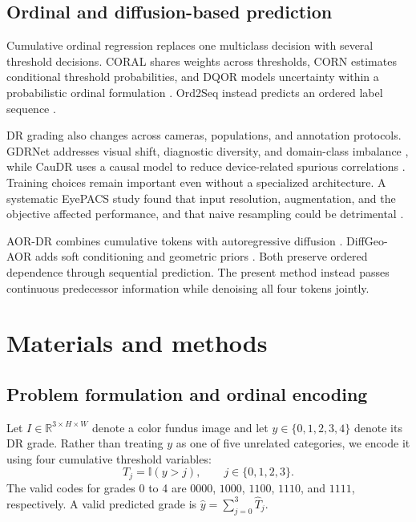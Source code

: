 \documentclass[a4paper,fleqn]{cas-sc}
\begin{document}
\subsection{Ordinal and diffusion-based prediction}

Cumulative ordinal regression replaces one multiclass decision with several threshold decisions. CORAL shares weights across thresholds, CORN estimates conditional threshold probabilities, and DQOR models uncertainty within a probabilistic ordinal formulation \citep{cao2020coral,shi2023corn,toledo2022dqor}. Ord2Seq instead predicts an ordered label sequence \citep{wang2023ord2seq}.

DR grading also changes across cameras, populations, and annotation protocols. GDRNet addresses visual shift, diagnostic diversity, and domain-class imbalance \citep{che2023gdrnet}, while CauDR uses a causal model to reduce device-related spurious correlations \citep{wei2024caudr}. Training choices remain important even without a specialized architecture. A systematic EyePACS study found that input resolution, augmentation, and the objective affected performance, and that naive resampling could be detrimental \citep{huang2023components}.

AOR-DR combines cumulative tokens with autoregressive diffusion \citep{yu2025aordr}. DiffGeo-AOR adds soft conditioning and geometric priors \citep{yu2026diffgeo}. Both preserve ordered dependence through sequential prediction. The present method instead passes continuous predecessor information while denoising all four tokens jointly.

\section{Materials and methods}
\label{sec:methods}

\subsection{Problem formulation and ordinal encoding}

Let $I\in\mathbb{R}^{3\times H\times W}$ denote a color fundus image and let $y\in\{0,1,2,3,4\}$ denote its DR grade. Rather than treating $y$ as one of five unrelated categories, we encode it using four cumulative threshold variables:
\begin{equation}
  T_j=\mathbb{I}(y>j), \qquad j\in\{0,1,2,3\}.
  \label{eq:tokens}
\end{equation}
The valid codes for grades 0 to 4 are $0000$, $1000$, $1100$, $1110$, and $1111$, respectively. A valid predicted grade is $\hat y=\sum_{j=0}^{3}\hat T_j$.
\end{document}
